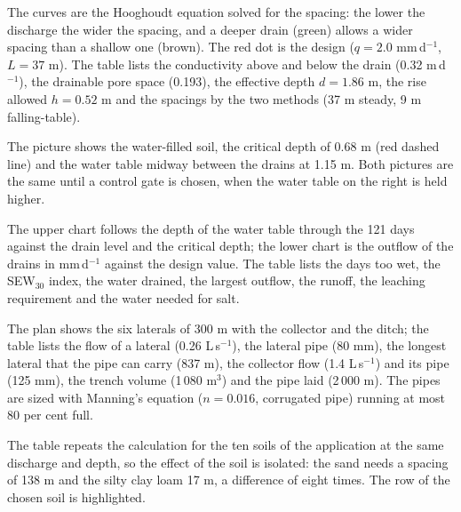 The curves are the Hooghoudt equation solved for the spacing: the lower the discharge the wider the spacing, and a deeper drain (green) allows a wider spacing than a shallow one (brown). The red dot is the design ($q=2.0$ mm\,d$^{-1}$, $L=37$ m). The table lists the conductivity above and below the drain (0.32 m\,d$^{-1}$), the drainable pore space (0.193), the effective depth $d=1.86$ m, the rise allowed $h=0.52$ m and the spacings by the two methods (37 m steady, 9 m falling-table).


The picture shows the water-filled soil, the critical depth of 0.68 m (red dashed line) and the water table midway between the drains at 1.15 m. Both pictures are the same until a control gate is chosen, when the water table on the right is held higher.


The upper chart follows the depth of the water table through the 121 days against the drain level and the critical depth; the lower chart is the outflow of the drains in mm\,d$^{-1}$ against the design value. The table lists the days too wet, the SEW$_{30}$ index, the water drained, the largest outflow, the runoff, the leaching requirement and the water needed for salt.


The plan shows the six laterals of 300 m with the collector and the ditch; the table lists the flow of a lateral (0.26 L\,s$^{-1}$), the lateral pipe (80 mm), the longest lateral that the pipe can carry (837 m), the collector flow (1.4 L\,s$^{-1}$) and its pipe (125 mm), the trench volume (1\,080 m$^3$) and the pipe laid (2\,000 m). The pipes are sized with Manning's equation ($n=0.016$, corrugated pipe) running at most 80 per cent full.


The table repeats the calculation for the ten soils of the application at the same discharge and depth, so the effect of the soil is isolated: the sand needs a spacing of 138 m and the silty clay loam 17 m, a difference of eight times. The row of the chosen soil is highlighted.

